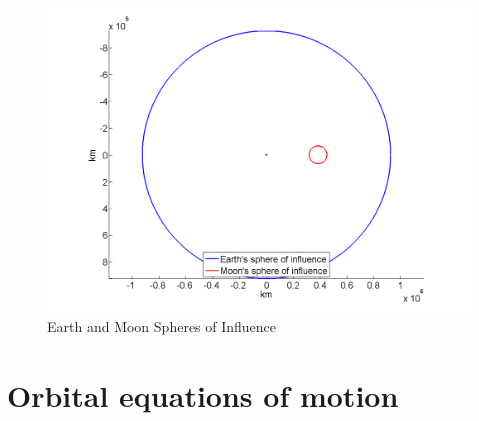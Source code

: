 \begin{figure} [h]
\begin{center}
\includegraphics[scale=0.4]{Images/Spheres-of-Influence.png}
\end{center}
\caption{Earth and Moon Spheres of Influence}
\label{fig:Spheres-of-Influence}
\end{figure}




\section{Orbital equations of motion} \label{sec:Orbital-equations-of-motion}


